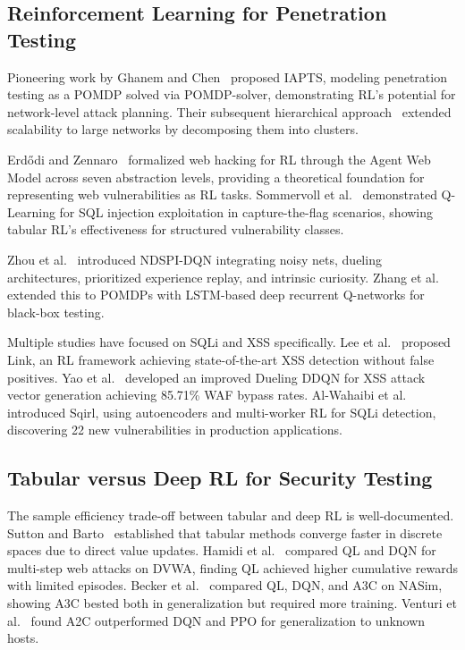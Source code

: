\documentclass[5p,twocolumn]{elsarticle}
\begin{document}
\subsection{Reinforcement Learning for Penetration Testing}

Pioneering work by Ghanem and Chen~\cite{ghanem2020} proposed IAPTS, modeling penetration testing as a POMDP solved via POMDP-solver, demonstrating RL's potential for network-level attack planning. Their subsequent hierarchical approach~\cite{ghanem2022} extended scalability to large networks by decomposing them into clusters.

Erd{\H o}di and Zennaro~\cite{erdodi2022} formalized web hacking for RL through the Agent Web Model across seven abstraction levels, providing a theoretical foundation for representing web vulnerabilities as RL tasks. Sommervoll et al.~\cite{sommervoll2023} demonstrated Q-Learning for SQL injection exploitation in capture-the-flag scenarios, showing tabular RL's effectiveness for structured vulnerability classes.

Zhou et al.~\cite{zhou2021autonomous} introduced NDSPI-DQN integrating noisy nets, dueling architectures, prioritized experience replay, and intrinsic curiosity. Zhang et al.~\cite{zhang2022} extended this to POMDPs with LSTM-based deep recurrent Q-networks for black-box testing.

Multiple studies have focused on SQLi and XSS specifically. Lee et al.~\cite{lee2022} proposed Link, an RL framework achieving state-of-the-art XSS detection without false positives. Yao et al.~\cite{yao2023} developed an improved Dueling DDQN for XSS attack vector generation achieving 85.71\% WAF bypass rates. Al-Wahaibi et al.~\cite{alwahaibi2023} introduced Sqirl, using autoencoders and multi-worker RL for SQLi detection, discovering 22 new vulnerabilities in production applications.

\subsection{Tabular versus Deep RL for Security Testing}

The sample efficiency trade-off between tabular and deep RL is well-documented. Sutton and Barto~\cite{sutton2018} established that tabular methods converge faster in discrete spaces due to direct value updates. Hamidi et al.~\cite{hamidi2023} compared QL and DQN for multi-step web attacks on DVWA, finding QL achieved higher cumulative rewards with limited episodes. Becker et al.~\cite{becker2024} compared QL, DQN, and A3C on NASim, showing A3C bested both in generalization but required more training. Venturi et al.~\cite{venturi2024} found A2C outperformed DQN and PPO for generalization to unknown hosts.
\end{document}
